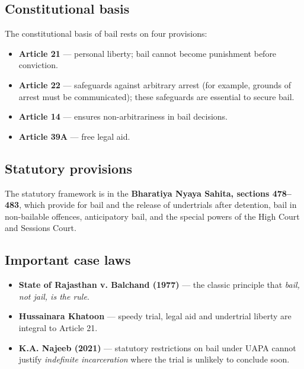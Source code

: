 \subsection{Constitutional basis}

\begin{GovtPolicy}
The constitutional basis of bail rests on four provisions:
\begin{itemize}
  \item \textbf{Article 21} — personal liberty; bail cannot become punishment before
        conviction.
  \item \textbf{Article 22} — safeguards against arbitrary arrest (for example, grounds
        of arrest must be communicated); these safeguards are essential to secure bail.
  \item \textbf{Article 14} — ensures non-arbitrariness in bail decisions.
  \item \textbf{Article 39A} — free legal aid.
\end{itemize}
\end{GovtPolicy}

\subsection{Statutory provisions}

The statutory framework is in the \textbf{Bharatiya Nyaya Sahita, sections 478--483},
which provide for bail and the release of undertrials after detention, bail in
non-bailable offences, anticipatory bail, and the special powers of the High Court and
Sessions Court.

\subsection{Important case laws}

\begin{itemize}
  \item \textbf{State of Rajasthan v. Balchand (1977)} — the classic principle that
        \emph{bail, not jail, is the rule}.
  \item \textbf{Hussainara Khatoon} — speedy trial, legal aid and undertrial liberty are
        integral to Article 21.
  \item \textbf{K.A. Najeeb (2021)} — statutory restrictions on bail under UAPA cannot
        justify \emph{indefinite incarceration} where the trial is unlikely to conclude
        soon.
\end{itemize}

